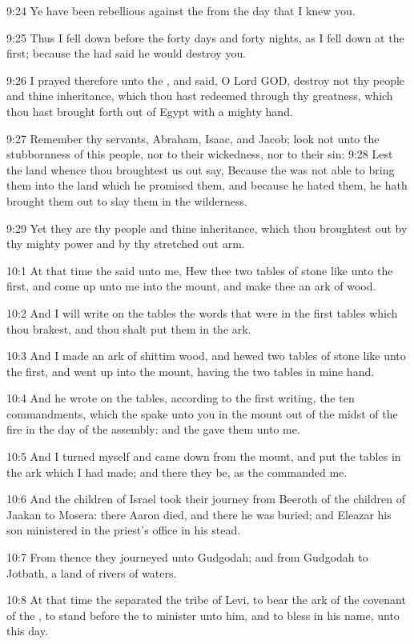 9:24 Ye have been rebellious against the \LORD from the day that I knew you.

9:25 Thus I fell down before the \LORD forty days and forty nights, as I fell down at the first; because the \LORD had said he would destroy you.

9:26 I prayed therefore unto the \LORD, and said, O Lord GOD, destroy not thy people and thine inheritance, which thou hast redeemed through thy greatness, which thou hast brought forth out of Egypt with a mighty hand.

9:27 Remember thy servants, Abraham, Isaac, and Jacob; look not unto the stubbornness of this people, nor to their wickedness, nor to their sin: 9:28 Lest the land whence thou broughtest us out say, Because the \LORD was not able to bring them into the land which he promised them, and because he hated them, he hath brought them out to slay them in the wilderness.

9:29 Yet they are thy people and thine inheritance, which thou broughtest out by thy mighty power and by thy stretched out arm.

10:1 At that time the \LORD said unto me, Hew thee two tables of stone like unto the first, and come up unto me into the mount, and make thee an ark of wood.

10:2 And I will write on the tables the words that were in the first tables which thou brakest, and thou shalt put them in the ark.

10:3 And I made an ark of shittim wood, and hewed two tables of stone like unto the first, and went up into the mount, having the two tables in mine hand.

10:4 And he wrote on the tables, according to the first writing, the ten commandments, which the \LORD spake unto you in the mount out of the midst of the fire in the day of the assembly: and the \LORD gave them unto me.

10:5 And I turned myself and came down from the mount, and put the tables in the ark which I had made; and there they be, as the \LORD commanded me.

10:6 And the children of Israel took their journey from Beeroth of the children of Jaakan to Mosera: there Aaron died, and there he was buried; and Eleazar his son ministered in the priest's office in his stead.

10:7 From thence they journeyed unto Gudgodah; and from Gudgodah to Jotbath, a land of rivers of waters.

10:8 At that time the \LORD separated the tribe of Levi, to bear the ark of the covenant of the \LORD, to stand before the \LORD to minister unto him, and to bless in his name, unto this day.

